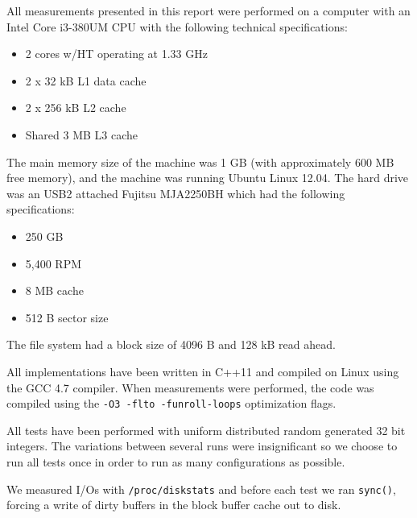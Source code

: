 All measurements presented in this report were performed on a computer
with an Intel Core i3-380UM CPU with the following technical
specifications:
\begin{itemize}
\item 2 cores w/HT operating at 1.33 GHz
\item 2 x 32 kB L1 data cache
\item 2 x 256 kB L2 cache
\item Shared 3 MB L3 cache
\end{itemize}
The main memory size of the machine was 1 GB (with approximately 600 MB free memory), and the machine was running Ubuntu
Linux 12.04. The hard drive was an USB2 attached Fujitsu MJA2250BH which had the following specifications:

\begin{itemize}
\item 250 GB
\item 5,400 RPM
\item 8 MB cache
\item 512 B sector size
\end{itemize}

The file system had a block size of 4096 B and 128 kB read ahead.

All implementations have been
written in C++11 and compiled on Linux using the GCC 4.7 compiler. When measurements were performed, the
code was compiled using the \texttt{-O3 -flto -funroll-loops}
optimization flags.

All tests have been performed with uniform distributed random generated 32 bit integers. The variations between several runs were insignificant so we choose to run all tests once in order to run as many configurations as possible.

We measured I/Os with \texttt{/proc/diskstats} and before each test we ran \texttt{sync()}, forcing a write of dirty buffers in the block buffer cache out to disk.